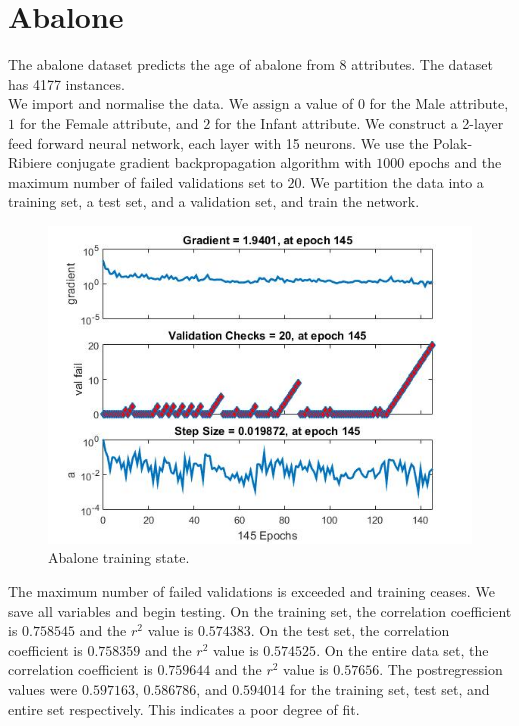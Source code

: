 \documentclass{article}%
\begin{document}
\section{Abalone}
The abalone dataset predicts the age of abalone from 8 attributes. The dataset has 4177 instances.
\\
We import and normalise the data. We assign a value of $0$ for the Male attribute, $1$ for the Female attribute, and $2$ for the Infant attribute. We construct a 2-layer feed forward neural network, each layer with 15 neurons. We use the Polak-Ribiere conjugate gradient backpropagation algorithm with $1000$ epochs and the maximum number of failed validations set to $20$. We partition the data into a training set, a test set, and a validation set, and train the network.
\begin{figure}[H]
\centering
\includegraphics[scale=0.5]{Abalone/training.jpg}
\caption{Abalone training state.}
\label{fig:abtrain}
\end{figure}
The maximum number of failed validations is exceeded and training ceases. We save all variables and begin testing. On the training set, the correlation coefficient is $0.758545$ and the $r^2$ value is $0.574383$. On the test set, the correlation coefficient is $0.758359$ and the $r^2$ value is $0.574525$. On the entire data set, the correlation coefficient is $0.759644$ and the $r^2$ value is $0.57656$. The postregression values were $0.597163$, $0.586786$, and $0.594014$ for the training set, test set, and entire set respectively. This indicates a poor degree of fit. 
\end{document}
